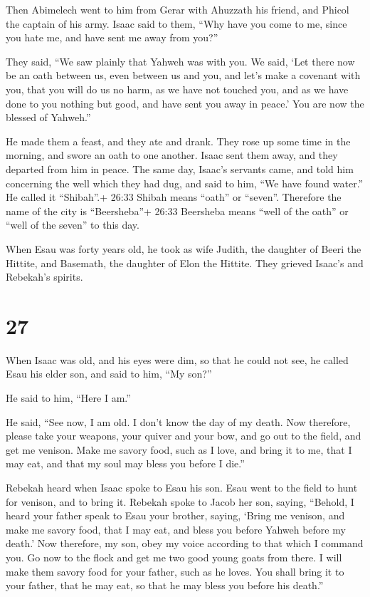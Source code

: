  Then Abimelech went to him from Gerar with Ahuzzath his
friend, and Phicol the captain of his army.  Isaac said to
them, ``Why have you come to me, since you hate me, and have sent me
away from you?''

 They said, ``We saw plainly that Yahweh was with you. We
said, `Let there now be an oath between us, even between us and you, and
let's make a covenant with you,  that you will do us no
harm, as we have not touched you, and as we have done to you nothing but
good, and have sent you away in peace.' You are now the blessed of
Yahweh.''

 He made them a feast, and they ate and drank.
 They rose up some time in the morning, and swore an oath
to one another. Isaac sent them away, and they departed from him in
peace.  The same day, Isaac's servants came, and told him
concerning the well which they had dug, and said to him, ``We have found
water.''  He called it ``Shibah''.+ 26:33 Shibah means
``oath'' or ``seven''. Therefore the name of the city is ``Beersheba''+
26:33 Beersheba means ``well of the oath'' or ``well of the seven'' to
this day.

 When Esau was forty years old, he took as wife Judith, the
daughter of Beeri the Hittite, and Basemath, the daughter of Elon the
Hittite.  They grieved Isaac's and Rebekah's spirits.

\hypertarget{section-26}{%
\section{27}\label{section-26}}

 When Isaac was old, and his eyes were dim, so that he could
not see, he called Esau his elder son, and said to him, ``My son?''

He said to him, ``Here I am.''

 He said, ``See now, I am old. I don't know the day of my
death.  Now therefore, please take your weapons, your quiver
and your bow, and go out to the field, and get me venison. 
Make me savory food, such as I love, and bring it to me, that I may eat,
and that my soul may bless you before I die.''

 Rebekah heard when Isaac spoke to Esau his son. Esau went
to the field to hunt for venison, and to bring it.  Rebekah
spoke to Jacob her son, saying, ``Behold, I heard your father speak to
Esau your brother, saying,  `Bring me venison, and make me
savory food, that I may eat, and bless you before Yahweh before my
death.'  Now therefore, my son, obey my voice according to
that which I command you.  Go now to the flock and get me
two good young goats from there. I will make them savory food for your
father, such as he loves.  You shall bring it to your
father, that he may eat, so that he may bless you before his death.''

